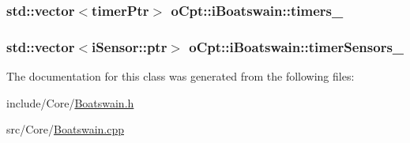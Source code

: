 \subsubsection[{\texorpdfstring{timers\+\_\+}{timers_}}]{\setlength{\rightskip}{0pt plus 5cm}std\+::vector$<${\bf timer\+Ptr}$>$ o\+Cpt\+::i\+Boatswain\+::timers\+\_\+\hspace{0.3cm}{\ttfamily [protected]}}\hypertarget{classo_cpt_1_1i_boatswain_a22f6f6b95b832600c9dc1827589dca3c}{}\label{classo_cpt_1_1i_boatswain_a22f6f6b95b832600c9dc1827589dca3c}
\subsubsection[{\texorpdfstring{timer\+Sensors\+\_\+}{timerSensors_}}]{\setlength{\rightskip}{0pt plus 5cm}std\+::vector$<${\bf i\+Sensor\+::ptr}$>$ o\+Cpt\+::i\+Boatswain\+::timer\+Sensors\+\_\+\hspace{0.3cm}{\ttfamily [protected]}}\hypertarget{classo_cpt_1_1i_boatswain_ac25402266e3daa376e407a9f5ba73130}{}\label{classo_cpt_1_1i_boatswain_ac25402266e3daa376e407a9f5ba73130}


The documentation for this class was generated from the following files\+:\begin{DoxyCompactItemize}
\item 
include/\+Core/\hyperlink{_boatswain_8h}{Boatswain.\+h}\item 
src/\+Core/\hyperlink{_boatswain_8cpp}{Boatswain.\+cpp}\end{DoxyCompactItemize}

